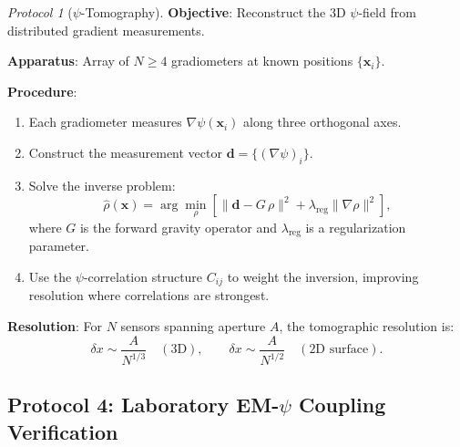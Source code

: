 \documentclass[12pt,a4paper]{article}
\theoremstyle{remark}
\newtheorem{protocol}{Protocol}
\begin{document}
\begin{protocol}[$\psi$-Tomography]\label{prot:tomography}
\textbf{Objective}: Reconstruct the 3D $\psi$-field from distributed
gradient measurements.

\textbf{Apparatus}: Array of $N \geq 4$ gradiometers at known positions
$\{\mathbf{x}_i\}$.

\textbf{Procedure}:
\begin{enumerate}
\item Each gradiometer measures $\nabla\psi(\mathbf{x}_i)$ along three
orthogonal axes.
\item Construct the measurement vector $\mathbf{d} = \{(\nabla\psi)_i\}$.
\item Solve the inverse problem:
\begin{equation}
\hat{\rho}(\mathbf{x}) = \arg\min_\rho \left[\|\mathbf{d} - G\,\rho\|^2 +
\lambda_{\text{reg}}\|\nabla\rho\|^2\right],
\end{equation}
where $G$ is the forward gravity operator and $\lambda_{\text{reg}}$ is a
regularization parameter.
\item Use the $\psi$-correlation structure $C_{ij}$ to weight the
inversion, improving resolution where correlations are strongest.
\end{enumerate}

\textbf{Resolution}: For $N$ sensors spanning aperture $A$, the tomographic
resolution is:
\begin{equation}
\delta x \sim \frac{A}{N^{1/3}} \quad (\text{3D}), \qquad
\delta x \sim \frac{A}{N^{1/2}} \quad (\text{2D surface}).
\end{equation}
\end{protocol}

\subsection{Protocol 4: Laboratory EM-$\psi$ Coupling Verification}
\end{document}
